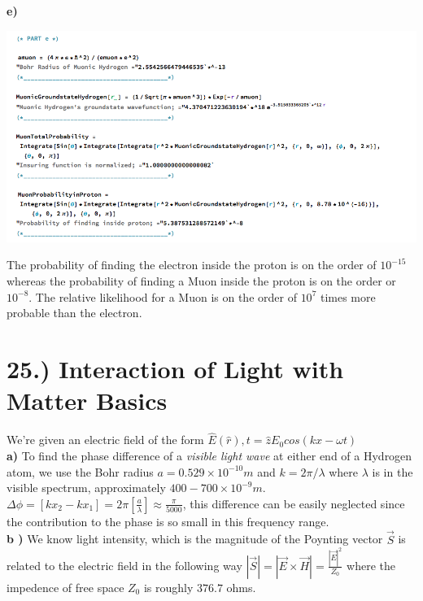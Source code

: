 \documentclass[10pt]{article}
\begin{document}
\textbf{e) } 

\begin{center}
    \includegraphics[width=0.9\linewidth]{parte.png}
\end{center}

The probability of finding the electron inside the proton is on the order of $10^{-15}$ whereas the probability of finding a Muon inside the proton is on the order or $10^{-8}$. The relative likelihood for a Muon is on the order of $10^{7}$ times more probable than the electron.

\section*{25.) Interaction of Light with Matter Basics}
We're given an electric field of the form $\hat{E}(\hat{r}),t=\hat{z}E_0cos(kx-\omega t)$\\

\textbf{a)}  To find the phase difference of a \textit{visible light wave} at either end of a Hydrogen atom, we use the Bohr radius $a=0.529\times10^{-10}m$ and $k=2\pi/\lambda$ where $\lambda$ is in the visible spectrum, approximately $400-700\times10^{-9}m$.\\

$\Delta\phi=[kx_2-kx_1]=2\pi[\frac{a}{\lambda}]\approx\frac{\pi}{5000}$, this difference can be easily neglected since the contribution to the phase is so small in this frequency range.\\

\textbf{ b ) } We know light intensity, which is the magnitude of the Poynting vector $\vec{S}$ is related to the electric field in the following way $|\vec{S}|=|\vec{E}\times\vec{H}|=\frac{|\vec{E}|^2}{Z_0}$ where the impedence of free space $Z_0$ is roughly $376.7$ ohms.\\
\end{document}
